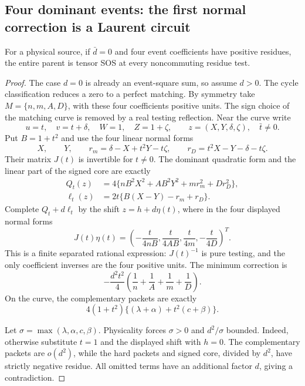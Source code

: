 \subsection{Four dominant events: the first normal correction is a Laurent circuit}
\begin{theorem}\label{thm:four-event-weighted}
For a physical source, if $\bar d=0$ and four event coefficients have positive residues, the entire parent is tensor SOS at every noncommuting residue test.
\end{theorem}
\begin{proof}
The case $d=0$ is already an event-square sum, so assume $d>0$. The cycle classification reduces a zero to a perfect matching. By symmetry take $M=\{n,m,A,D\}$, with these four coefficients positive units. The sign choice of the matching curve is removed by a real testing reflection. Near the curve write
\[
u=t,\quad v=t+\delta,\quad W=1,\quad Z=1+\zeta,
\qquad z=(X,Y,\delta,\zeta),\quad \bar t\ne0.
\]
Put $B=1+t^2$ and use the four linear normal forms
\[
X,\qquad Y,\qquad r_m=\delta-X+t^2Y-t\zeta,
\qquad r_D=t^2X-Y-\delta-t\zeta.
\]
Their matrix $J(t)$ is invertible for $t\ne0$. The dominant quadratic form and the linear part of the signed core are exactly
\begin{align*}
Q_t(z)&=4\{nB^2X^2+AB^2Y^2+m r_m^2+D r_D^2\},\\
\ell_t(z)&=2t\{B(X-Y)-r_m+r_D\}.
\end{align*}
Complete $Q_t+d\ell_t$ by the shift $z=h+d\eta(t)$, where in the four displayed normal forms
\[
J(t)\eta(t)=\left(-\frac{t}{4nB},\frac{t}{4AB},\frac{t}{4m},-\frac{t}{4D}\right)^T.
\]
This is a finite separated rational expression: $J(t)^{-1}$ is pure testing, and the only coefficient inverses are the four positive units. The minimum correction is
\[
-\frac{d^2t^2}{4}\left(\frac1n+\frac1A+\frac1m+\frac1D\right).
\]
On the curve, the complementary packets are exactly
\[
4(1+t^2)\{(\lambda+\alpha)+t^2(c+\beta)\}.
\]

Let $\sigma=\max(\lambda,\alpha,c,\beta)$. Physicality forces $\sigma>0$ and $d^2/\sigma$ bounded. Indeed, otherwise substitute $t=1$ and the displayed shift with $h=0$. The complementary packets are $o(d^2)$, while the hard packets and signed core, divided by $d^2$, have strictly negative residue. All omitted terms have an additional factor $d$, giving a contradiction.


\end{proof}
